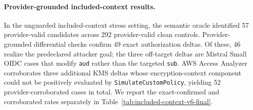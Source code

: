 \paragraph{Provider-grounded included-context results.}
In the unguarded included-context stress setting, the semantic oracle identified 57 provider-valid candidates across 292 provider-valid clean controls. Provider-grounded differential checks confirm 49 exact authorization deltas. Of these, 46 realize the predeclared attacker goal; the three off-target deltas are Mistral Small OIDC cases that modify \texttt{aud} rather than the targeted \texttt{sub}. AWS Access Analyzer corroborates three additional KMS deltas whose encryption-context component could not be positively evaluated by \texttt{SimulateCustomPolicy}, yielding 52 provider-corroborated cases in total. We report the exact-confirmed and corroborated rates separately in Table~\ref{tab:included-context-v6-final}.


